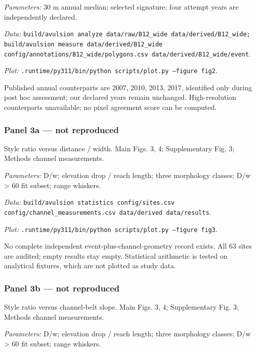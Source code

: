 \textit{Parameters:} 30 m annual median; selected signature; four attempt years are independently declared.

\textit{Data:} \texttt{build/\allowbreak{}avulsion analyze data/\allowbreak{}raw/\allowbreak{}B12\_wide data/\allowbreak{}derived/\allowbreak{}B12\_wide; build/\allowbreak{}avulsion measure data/\allowbreak{}derived/\allowbreak{}B12\_wide config/\allowbreak{}annotations/\allowbreak{}B12\_wide/\allowbreak{}polygons.csv data/\allowbreak{}derived/\allowbreak{}B12\_wide/\allowbreak{}event}.

\textit{Plot:} \texttt{.runtime/\allowbreak{}py311/\allowbreak{}bin/\allowbreak{}python scripts/\allowbreak{}plot.py --figure fig2}.

Published annual counterparts are 2007, 2010, 2013, 2017, identified only during post hoc assessment; our declared years remain unchanged. High-resolution counterparts unavailable; no pixel agreement score can be computed.

\subsubsection*{Panel 3a --- not reproduced}
Style ratio versus distance / width. Main Figs. 3, 4; Supplementary Fig. 3; Methods channel measurements.

\textit{Parameters:} D/w; elevation drop / reach length; three morphology classes; D/w > 60 fit subset; range whiskers.

\textit{Data:} \texttt{build/\allowbreak{}avulsion statistics config/\allowbreak{}sites.csv config/\allowbreak{}channel\_measurements.csv data/\allowbreak{}derived data/\allowbreak{}results}.

\textit{Plot:} \texttt{.runtime/\allowbreak{}py311/\allowbreak{}bin/\allowbreak{}python scripts/\allowbreak{}plot.py --figure fig3}.

No complete independent event-plus-channel-geometry record exists. All 63 sites are audited; empty results stay empty. Statistical arithmetic is tested on analytical fixtures, which are not plotted as study data.

\subsubsection*{Panel 3b --- not reproduced}
Style ratio versus channel-belt slope. Main Figs. 3, 4; Supplementary Fig. 3; Methods channel measurements.

\textit{Parameters:} D/w; elevation drop / reach length; three morphology classes; D/w > 60 fit subset; range whiskers.

